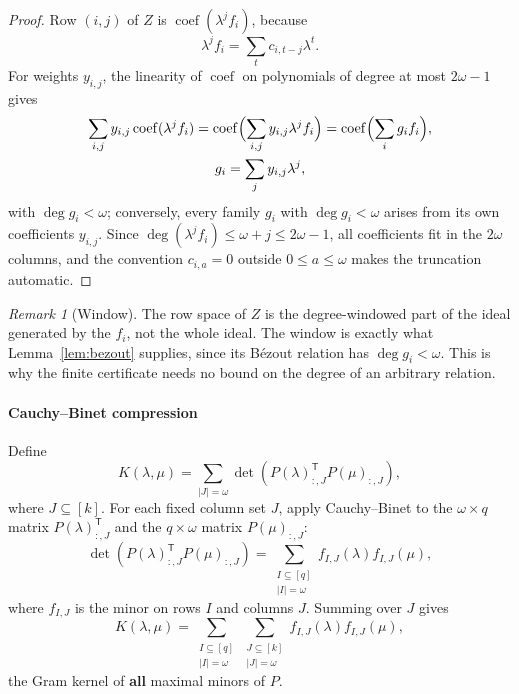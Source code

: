 \documentclass[journal]{IEEEtran}
\theoremstyle{plainn}
\theoremstyle{remark}
\newtheorem{remark}{Remark}
\begin{document}
\begin{proof}
	Row $(i,j)$ of $Z$ is $\operatorname{coef}(\lambda^jf_i)$, because
	\begin{equation}
	\lambda^jf_i=\sum_t c_{i,t-j}\lambda^t.
	\end{equation}
	For weights $y_{i,j}$, the linearity of $\operatorname{coef}$ on
	polynomials of degree at most $2\omega-1$ gives
	\begin{equation}
		\begin{gathered}
			\sum_{i,j}y_{i,j}\operatorname{coef}(\lambda^jf_i)
			=
			\operatorname{coef}\Bigl(\sum_{i,j}y_{i,j}\lambda^jf_i\Bigr)
			=
			\operatorname{coef}\Bigl(\sum_i g_if_i\Bigr),\\
			g_i=\sum_j y_{i,j}\lambda^j,
		\end{gathered}
	\end{equation}
	with $\deg g_i<\omega$; conversely, every family $g_i$ with
	$\deg g_i<\omega$ arises from its own coefficients $y_{i,j}$.
	Since $\deg(\lambda^jf_i)\le\omega+j\le2\omega-1$, all coefficients
	fit in the $2\omega$ columns, and the convention $c_{i,a}=0$
	outside $0\le a\le\omega$ makes the truncation automatic.
\end{proof}

\begin{remark}[Window]
	The row space of $Z$ is the degree-windowed part of the ideal generated
	by the $f_i$, not the whole ideal. The window is exactly what
	Lemma~\ref{lem:bezout} supplies, since its B\'ezout relation has
	$\deg g_i<\omega$. This is why the finite certificate needs no bound on
	the degree of an arbitrary relation.
\end{remark}

\paragraph{Cauchy--Binet compression}\label{sec:cb}
Define
\begin{equation}
	K(\lambda,\mu)=\sum_{|J|=\omega}
	\det\left(P(\lambda)_{:,J}^{\mathsf T}P(\mu)_{:,J}\right),
\end{equation}
where $J\subseteq[k]$. For each fixed column set $J$, apply
Cauchy--Binet to the $\omega\times q$ matrix
$P(\lambda)_{:,J}^{\mathsf T}$ and the $q\times\omega$ matrix
$P(\mu)_{:,J}$:
\begin{equation}
	\det\!\left(P(\lambda)_{:,J}^{\mathsf T}P(\mu)_{:,J}\right)
	=\sum_{\substack{I\subseteq[q]\\ |I|=\omega}}
	f_{I,J}(\lambda)f_{I,J}(\mu),
\end{equation}
where $f_{I,J}$ is the minor on rows $I$ and columns $J$.
Summing over $J$ gives
\begin{equation}
	K(\lambda,\mu)=\sum_{\substack{I\subseteq[q]\\ |I|=\omega}}
	\sum_{\substack{J\subseteq[k]\\ |J|=\omega}}
	f_{I,J}(\lambda)f_{I,J}(\mu),
\end{equation}
the Gram kernel of \textbf{all} maximal minors of $P$.
\end{document}
